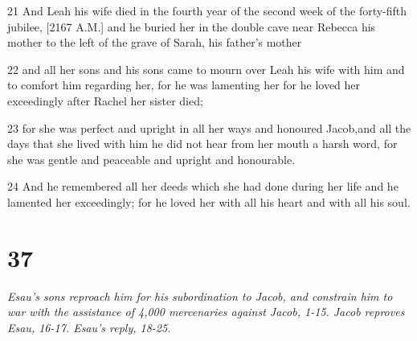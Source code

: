 \par 21 And Leah his wife died in the fourth year of the second week of the forty-fifth jubilee, [2167 A.M.] and he buried her in the double cave near Rebecca his mother to the left of the grave of Sarah, his father's mother
\par 22 and all her sons and his sons came to mourn over Leah his wife with him and to comfort him regarding her, for he was lamenting her for he loved her exceedingly after Rachel her sister died;
\par 23 for she was perfect and upright in all her ways and honoured Jacob,and all the days that she lived with him he did not hear from her mouth a harsh word, for she was gentle and peaceable and upright and honourable.
\par 24 And he remembered all her deeds which she had done during her life and he lamented her exceedingly; for he loved her with all his heart and with all his soul.

\chapter{37}

\par \textit{Esau's sons reproach him for his subordination to Jacob, and constrain him to war with the assistance of 4,000 mercenaries against Jacob, 1-15. Jacob reproves Esau, 16-17. Esau's reply, 18-25.}

